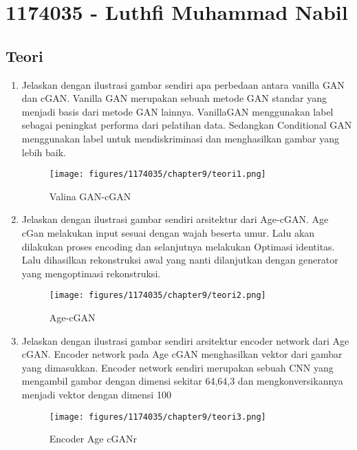 \section{1174035 - Luthfi Muhammad Nabil}
\subsection{Teori}
    \begin{enumerate}

        \item Jelaskan dengan ilustrasi gambar sendiri apa perbedaan antara vanilla GAN dan cGAN.
		Vanilla GAN merupakan sebuah metode GAN standar yang menjadi basis dari metode GAN lainnya. VanillaGAN menggunakan label sebagai peningkat performa dari pelatihan data. Sedangkan Conditional GAN menggunakan label untuk mendiskriminasi dan menghasilkan gambar yang lebih baik.
			\begin{figure}[H]
            	\texttt{[image: figures/1174035/chapter9/teori1.png]}
           		\centering
           		\caption{Valina GAN-cGAN}
            \end{figure}
            
        \item Jelaskan dengan ilustrasi gambar sendiri arsitektur dari Age-cGAN.
			Age cGan melakukan input sesuai dengan wajah beserta umur. Lalu akan dilakukan proses encoding dan selanjutnya melakukan Optimasi identitas. Lalu dihasilkan rekonstruksi awal yang nanti dilanjutkan dengan generator yang mengoptimasi rekonstruksi.
			\begin{figure}[H]
				\texttt{[image: figures/1174035/chapter9/teori2.png]}
            		\centering
           		\caption{Age-cGAN}
            \end{figure}
                
        \item Jelaskan dengan ilustrasi gambar sendiri arsitektur encoder network dari Age cGAN.
			Encoder network pada Age cGAN menghasilkan vektor dari gambar yang dimasukkan. Encoder network sendiri merupakan sebuah CNN yang mengambil gambar dengan dimensi sekitar 64,64,3 dan mengkonversikannya menjadi vektor dengan dimensi 100
            \begin{figure}[H]
                \texttt{[image: figures/1174035/chapter9/teori3.png]}
                    \centering
                \caption{Encoder Age cGANr}
            \end{figure}


\end{enumerate}
